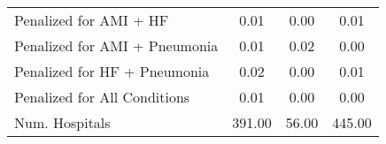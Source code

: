 \begin{table}[ht!]
\begin{tabular}[t]{lccc}
\hspace{1em}Penalized for AMI + HF & 0.01 & 0.00 & 0.01\\
\hspace{1em}Penalized for AMI + Pneumonia & 0.01 & 0.02 & 0.00\\
\hspace{1em}Penalized for HF + Pneumonia & 0.02 & 0.00 & 0.01\\
\hspace{1em}Penalized for All Conditions & 0.01 & 0.00 & 0.00\\
Num. Hospitals & 391.00 & 56.00 & 445.00\\
\bottomrule
\end{tabular}
\end{table}

